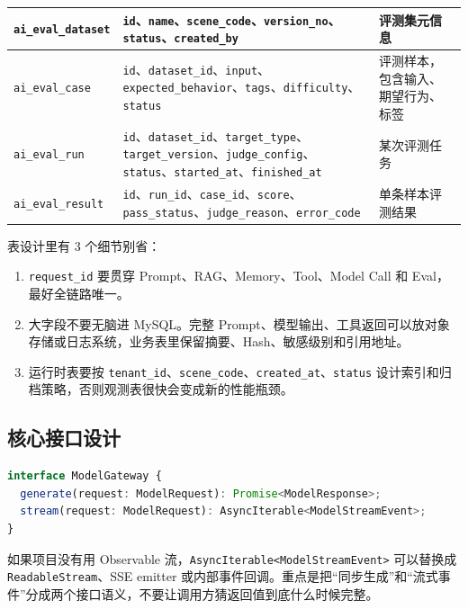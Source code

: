 \documentclass[9pt,a4paper,twocolumn]{ctexart}
\begin{document}
{\begin{tabular}{|p{}|p{}|p{}|}
\hline
\texttt{ai\_eval\_dataset} & \texttt{id}、\texttt{name}、\texttt{scene\_code}、\texttt{version\_no}、\texttt{status}、\texttt{created\_by} & 评测集元信息 \\
\hline
\texttt{ai\_eval\_case} & \texttt{id}、\texttt{dataset\_id}、\texttt{input}、\texttt{expected\_behavior}、\texttt{tags}、\texttt{difficulty}、\texttt{status} & 评测样本，包含输入、期望行为、标签 \\
\hline
\texttt{ai\_eval\_run} & \texttt{id}、\texttt{dataset\_id}、\texttt{target\_type}、\texttt{target\_version}、\texttt{judge\_config}、\texttt{status}、\texttt{started\_at}、\texttt{finished\_at} & 某次评测任务 \\
\hline
\texttt{ai\_eval\_result} & \texttt{id}、\texttt{run\_id}、\texttt{case\_id}、\texttt{score}、\texttt{pass\_status}、\texttt{judge\_reason}、\texttt{error\_code} & 单条样本评测结果 \\
\hline
\end{tabular}
}



表设计里有 3 个细节别省：


\begin{enumerate}[itemsep=1pt, topsep=2pt]
  \item \texttt{request\_id} 要贯穿 Prompt、RAG、Memory、Tool、Model Call 和 Eval，最好全链路唯一。
  \item 大字段不要无脑进 MySQL。完整 Prompt、模型输出、工具返回可以放对象存储或日志系统，业务表里保留摘要、Hash、敏感级别和引用地址。
  \item 运行时表要按 \texttt{tenant\_id}、\texttt{scene\_code}、\texttt{created\_at}、\texttt{status} 设计索引和归档策略，否则观测表很快会变成新的性能瓶颈。
\end{enumerate}


\subsection*{核心接口设计}


\begin{lstlisting}[language=TypeScript]
interface ModelGateway {
  generate(request: ModelRequest): Promise<ModelResponse>;
  stream(request: ModelRequest): AsyncIterable<ModelStreamEvent>;
}
\end{lstlisting}



如果项目没有用 Observable 流，\texttt{AsyncIterable<ModelStreamEvent>} 可以替换成 \texttt{ReadableStream}、SSE emitter 或内部事件回调。重点是把“同步生成”和“流式事件”分成两个接口语义，不要让调用方猜返回值到底什么时候完整。
\end{document}
